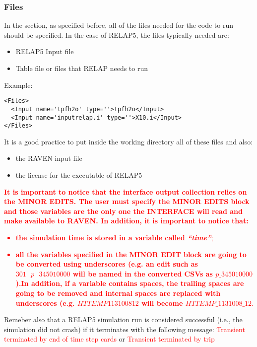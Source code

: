 \subsubsection{Files}
In the  section, as specified before, all of the files needed for
the code to run should be specified.
%
In the case of RELAP5, the files typically needed are:
\begin{itemize}
  \item RELAP5 Input file
  \item Table file or files that RELAP needs to run
\end{itemize}
Example:
\begin{lstlisting}[style=XML]
<Files>
  <Input name='tpfh2o' type=''>tpfh2o</Input>
  <Input name='inputrelap.i' type=''>X10.i</Input>
</Files>
\end{lstlisting}

It is a good practice to put inside the working directory all of these files and
also:
\begin{itemize}
  \item the RAVEN input file
  \item the license for the executable of RELAP5
\end{itemize}
\textcolor{red}{
\textbf{It is important to notice that the interface output collection relies on the MINOR EDITS. The user must specify the MINOR
EDITS block and those variables are the only one the INTERFACE will read and make available to RAVEN. In addition, it is important to notice that:}
\begin{itemize}
  \item \textbf{the simulation time is stored in a variable called \textit{``time''}};
  \item \textbf{all the variables specified in the MINOR EDIT block are going to be converted using underscores (e.g.  an edit such as
  $301 \:\:\: p \:\:\: 345010000$ will be named in the converted CSVs as $p\_345010000$).In addition, if a variable contains spaces, the trailing spaces
   are going to be removed and internal spaces are replaced with underscores (e.g. $HTTEMP 1131008 12$ will become $HTTEMP\_1131008\_12$}.
\end{itemize}
}

Remeber also that a RELAP5 simulation run is considered successful (i.e., the simulation did not crash) if it terminates with the following
message:
\textcolor{red}{Transient terminated by end of time step cards}
or
\textcolor{red}{Transient terminated by trip}

